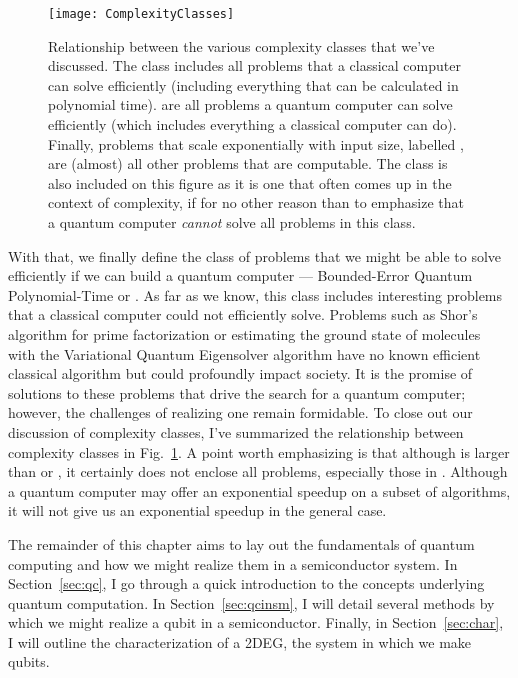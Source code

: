 \begin{figure}
  \texttt{[image: ComplexityClasses]}
  \caption[Relationship between various complexity classes]
  {Relationship between the various complexity classes that we've discussed. The class
   includes all problems that a classical computer can solve efficiently (including
  everything that can be calculated in polynomial time).  are all problems a quantum computer can
  solve efficiently (which includes everything a classical computer can do). Finally, problems that scale exponentially
  with input size, labelled , are (almost) all other problems that are computable. The class
   is also included on this figure as it is one that often comes up in the context of complexity,
  if for no other reason than to emphasize that a quantum computer \emph{cannot} solve all problems in
  this class.}
  \label{fig:complexity}
\end{figure}

With that, we finally define the class of problems that we might be able to solve efficiently if we
can build a quantum computer --- Bounded-Error Quantum Polynomial-Time or . As far as we know,
this class includes interesting problems that a classical computer could not efficiently solve. Problems
such as Shor's algorithm for prime factorization \cite{Shor} or estimating the ground state of molecules with
the Variational Quantum Eigensolver algorithm \cite{ncomms5213} have no known efficient classical algorithm
but could profoundly impact society. It is the promise of solutions to these problems
that drive the search for a quantum computer; however, the challenges of realizing one remain formidable. To close
out our discussion of complexity classes, I've summarized the relationship between complexity classes in
Fig.~\ref{fig:complexity}. A point worth emphasizing is that although  is larger than 
or , it certainly does not enclose all problems, especially those in . Although a
quantum computer may offer an exponential speedup on a subset of algorithms, it will not give us an exponential
speedup in the general case.

The remainder of this chapter aims to lay out the fundamentals of quantum computing and how we might realize
them in a semiconductor system. In Section~\ref{sec:qc}, I go through a quick introduction to the concepts
underlying quantum computation. In Section~\ref{sec:qcinsm}, I will detail several methods by which we might
realize a qubit in a semiconductor. Finally, in Section~\ref{sec:char}, I will outline the characterization of a 2DEG,
the system in which we make qubits.

